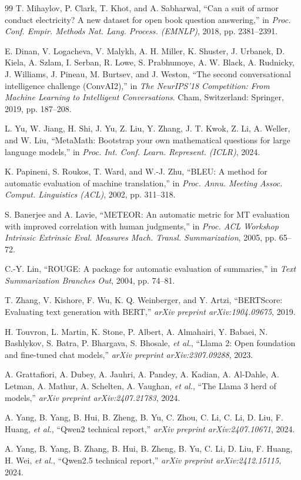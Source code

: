 \documentclass[a4paper,11pt]{article}
\begin{document}
\begin{thebibliography}{99}
T. Mihaylov, P. Clark, T. Khot, and A. Sabharwal, ``Can a suit of armor conduct electricity? A new dataset for open book question answering,'' in \emph{Proc. Conf. Empir. Methods Nat. Lang. Process. (EMNLP)}, 2018, pp. 2381--2391.

E. Dinan, V. Logacheva, V. Malykh, A. H. Miller, K. Shuster, J. Urbanek, D. Kiela, A. Szlam, I. Serban, R. Lowe, S. Prabhumoye, A. W. Black, A. Rudnicky, J. Williams, J. Pineau, M. Burtsev, and J. Weston, ``The second conversational intelligence challenge (ConvAI2),'' in \emph{The NeurIPS'18 Competition: From Machine Learning to Intelligent Conversations}. Cham, Switzerland: Springer, 2019, pp. 187--208.

L. Yu, W. Jiang, H. Shi, J. Yu, Z. Liu, Y. Zhang, J. T. Kwok, Z. Li, A. Weller, and W. Liu, ``MetaMath: Bootstrap your own mathematical questions for large language models,'' in \emph{Proc. Int. Conf. Learn. Represent. (ICLR)}, 2024.

K. Papineni, S. Roukos, T. Ward, and W.-J. Zhu, ``BLEU: A method for automatic evaluation of machine translation,'' in \emph{Proc. Annu. Meeting Assoc. Comput. Linguistics (ACL)}, 2002, pp. 311--318.

S. Banerjee and A. Lavie, ``METEOR: An automatic metric for MT evaluation with improved correlation with human judgments,'' in \emph{Proc. ACL Workshop Intrinsic Extrinsic Eval. Measures Mach. Transl. Summarization}, 2005, pp. 65--72.

C.-Y. Lin, ``ROUGE: A package for automatic evaluation of summaries,'' in \emph{Text Summarization Branches Out}, 2004, pp. 74--81.

T. Zhang, V. Kishore, F. Wu, K. Q. Weinberger, and Y. Artzi, ``BERTScore: Evaluating text generation with BERT,'' \emph{arXiv preprint arXiv:1904.09675}, 2019.

H. Touvron, L. Martin, K. Stone, P. Albert, A. Almahairi, Y. Babaei, N. Bashlykov, S. Batra, P. Bhargava, S. Bhosale, \emph{et al.}, ``Llama 2: Open foundation and fine-tuned chat models,'' \emph{arXiv preprint arXiv:2307.09288}, 2023.

A. Grattafiori, A. Dubey, A. Jauhri, A. Pandey, A. Kadian, A. Al-Dahle, A. Letman, A. Mathur, A. Schelten, A. Vaughan, \emph{et al.}, ``The Llama 3 herd of models,'' \emph{arXiv preprint arXiv:2407.21783}, 2024.

A. Yang, B. Yang, B. Hui, B. Zheng, B. Yu, C. Zhou, C. Li, C. Li, D. Liu, F. Huang, \emph{et al.}, ``Qwen2 technical report,'' \emph{arXiv preprint arXiv:2407.10671}, 2024.

A. Yang, B. Yang, B. Zhang, B. Hui, B. Zheng, B. Yu, C. Li, D. Liu, F. Huang, H. Wei, \emph{et al.}, ``Qwen2.5 technical report,'' \emph{arXiv preprint arXiv:2412.15115}, 2024.

\end{thebibliography}
\end{document}
